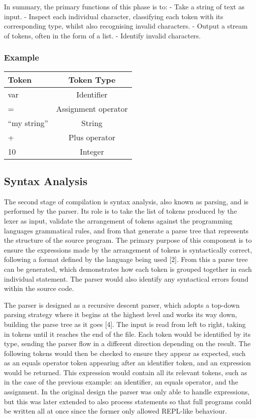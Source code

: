 \documentclass[
]{report}
\begin{document}
In summary, the primary functions of this phase is to: - Take a string
of text as input. - Inspect each individual character, classifying each
token with its corresponding type, whilst also recognising invalid
characters. - Output a stream of tokens, often in the form of a list. -
Identify invalid characters.

\subsubsection{Example}
\begin{longtable}[l]{@{}lc@{}}
\toprule
Token & Token Type\tabularnewline
\midrule
\endhead
var & Identifier\tabularnewline
= & Assignment operator\tabularnewline
``my string'' & String\tabularnewline
+ & Plus operator\tabularnewline
10 & Integer\tabularnewline
\bottomrule
\end{longtable}

\subsection{Syntax Analysis}
The second stage of compilation is syntax analysis, also known as
parsing, and is performed by the parser. Its role is to take the list of
tokens produced by the lexer as input, validate the arrangement of
tokens against the programming languages grammatical rules, and from
that generate a parse tree that represents the structure of the source
program. The primary purpose of this component is to ensure the
expressions made by the arrangement of tokens is syntactically correct,
following a format defined by the language being used {[}2{]}. From this
a parse tree can be generated, which demonstrates how each token is
grouped together in each individual statement. The parser would also
identify any syntactical errors found within the source code.

The parser is designed as a recursive descent parser, which adopts a
top-down parsing strategy where it begins at the highest level and works
its way down, building the parse tree as it goes {[}4{]}. The input is
read from left to right, taking in tokens until it reaches the end of
the file. Each token would be identified by its type, sending the parser
flow in a different direction depending on the result. The following
tokens would then be checked to ensure they appear as expected, such as
an equals operator token appearing after an identifier token, and an
expression would be returned. This expression would contain all its
relevant tokens, such as in the case of the previous example: an
identifier, an equals operator, and the assignment. In the original
design the parser was only able to handle expressions, but this was
later extended to also process statements so that full programs could be
written all at once since the former only allowed REPL-like behaviour.
\end{document}
